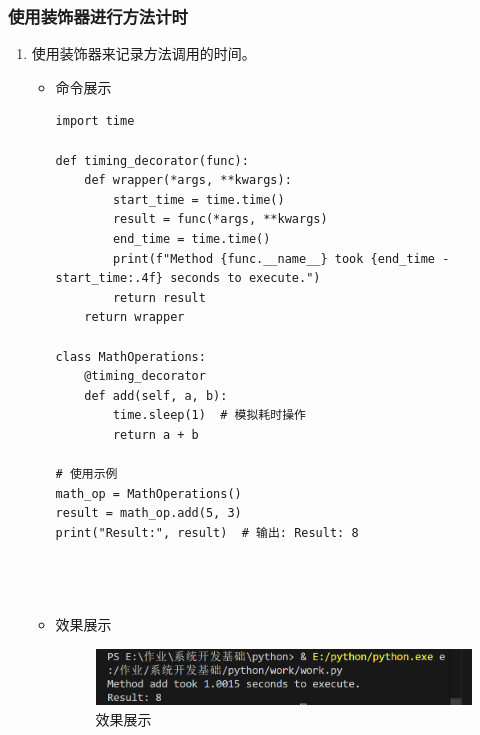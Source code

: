 \documentclass[UTF8]{ctexart}
\begin{document}
\subsubsection{使用装饰器进行方法计时}

\begin{enumerate}
  \item 使用装饰器来记录方法调用的时间。
  \begin{itemize}
  \item 命令展示
  \begin{verbatim}
import time

def timing_decorator(func):
    def wrapper(*args, **kwargs):
        start_time = time.time()
        result = func(*args, **kwargs)
        end_time = time.time()
        print(f"Method {func.__name__} took {end_time - start_time:.4f} seconds to execute.")
        return result
    return wrapper

class MathOperations:
    @timing_decorator
    def add(self, a, b):
        time.sleep(1)  # 模拟耗时操作
        return a + b

# 使用示例
math_op = MathOperations()
result = math_op.add(5, 3)
print("Result:", result)  # 输出: Result: 8


    
  \end{verbatim}

  \item 效果展示
  \begin{figure}[H]
    \centering
    \includegraphics[width=\textwidth]{266} %
    \caption{效果展示}
  
  \end{figure}
\end{itemize}
\end{enumerate}
\end{document}
